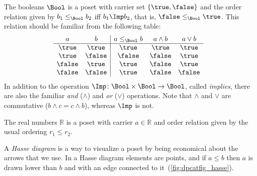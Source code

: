 \begin{example}[Booleans]\label{ex:bool}
The booleans $\Bool$ is a poset with carrier set $\{\true,\false\}$ and the order relation given by $b_1 \leq_\Bool b_2$ iff $b_1 \Imp b_2$, that is, $\false \leq_\Bool \true$. This relation should be familiar from the following table:
\[
\begin{array}{cc|ccc}
a & b & a \leq_\Bool b & a \wedge b & a \vee b \\ \hline
\true&\true&\true&\true&\true\\
\true&\false&\false&\false&\true\\
\false&\true&\true&\false&\true\\
\false&\false&\true&\false&\false
\end{array}
\]
In addition to the operation $\Imp\colon\Bool\times \Bool\to\Bool$, called \emph{implies}, there are also the familiar \emph{and} ($\wedge$) and \emph{or} ($\vee$) operations. Note that $\wedge$ and $\vee$ are commutative ($b\wedge c = c\wedge b$), whereas $\Imp$ is not.
\end{example}



\begin{example}[Reals]
The real numbers $\mathbb{R}$ is a poset with carrier $a\in \mathbb{R}$ and order relation given by the usual ordering $r_1 \leq r_2$.
\end{example}


A \emph{Hasse diagram} is a way to visualize a poset by being economical about the arrows that we use. In a Hasse diagram elements are points, and if $a \leq b$ then $a$ is drawn lower than $b$ and with an edge connected to it~(\cref{fig:dpcatfig_hasse}).



\begin{figure}[h!]
   \centering
   \caption{\label{fig:hasse}}
\end{figure}

